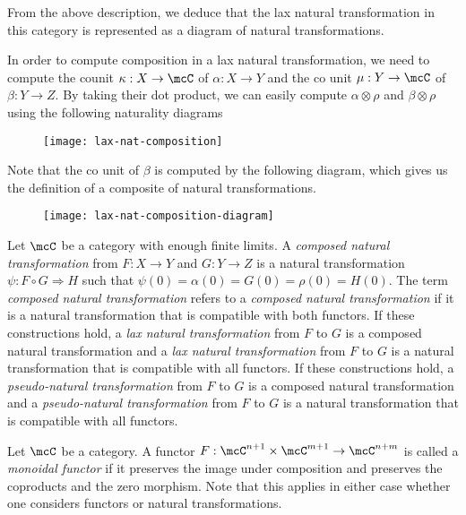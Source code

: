 \documentclass[a4paper,reqno,oneside]{article}
\begin{document}
From the above description, we deduce that the lax natural transformation in this category is represented as a diagram of natural transformations.

In order to compute composition in a lax natural transformation, we need to compute the counit $\kappa : X \to \mcC$ of $\alpha : X \to Y$ and the co unit $\mu : Y \to \mcC$ of $\beta : Y \to Z$. By taking their dot product, we can easily compute $\alpha \otimes \rho$ and $\beta \otimes \rho$ using the following naturality diagrams

\begin{figure}[h!]
	\centering
	\texttt{[image: lax-nat-composition]}
\end{figure}

Note that the co unit of $\beta$ is computed by the following diagram, which gives us the definition of a composite of natural transformations.

\begin{figure}[h!]
	\centering
	\texttt{[image: lax-nat-composition-diagram]}
\end{figure}

\begin{definition}
	Let $\mcC$ be a category with enough finite limits. A \textit{composed natural transformation} from $F : X \to Y$ and $G : Y \to Z$ is a natural transformation $\psi : F \circ G \Rightarrow H$ such that $\psi(0) = \alpha(0) = G(0) = \rho(0) = H(0)$. The term \textit{composed natural transformation} refers to a \textit{composed natural transformation} if it is a natural transformation that is compatible with both functors. If these constructions hold, a \textit{lax natural transformation} from $F$ to $G$ is a composed natural transformation and a \textit{lax natural transformation} from $F$ to $G$ is a natural transformation that is compatible with all functors. If these constructions hold, a \textit{pseudo-natural transformation} from $F$ to $G$ is a composed natural transformation and a \textit{pseudo-natural transformation} from $F$ to $G$ is a natural transformation that is compatible with all functors.
\end{definition}

\begin{definition}\label{def:monoidal-functor-cat}
	Let $\mcC$ be a category. A functor $F : \mcC^{n+1} \times \mcC^{m+1} \to \mcC^{n+m}$ is called a \textit{monoidal functor} if it preserves the image under composition and preserves the coproducts and the zero morphism. Note that this applies in either case whether one considers functors or natural transformations.
\end{definition}
\end{document}

